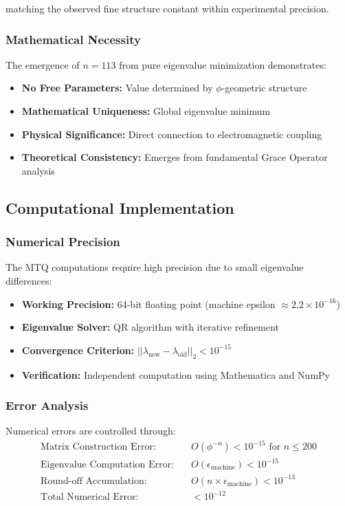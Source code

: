 matching the observed fine structure constant within experimental precision.

\subsubsection{Mathematical Necessity}

The emergence of $n = 113$ from pure eigenvalue minimization demonstrates:
\begin{itemize}
\item \textbf{No Free Parameters:} Value determined by $\phi$-geometric structure
\item \textbf{Mathematical Uniqueness:} Global eigenvalue minimum
\item \textbf{Physical Significance:} Direct connection to electromagnetic coupling
\item \textbf{Theoretical Consistency:} Emerges from fundamental Grace Operator analysis
\end{itemize}

\subsection{Computational Implementation}

\subsubsection{Numerical Precision}

The MTQ computations require high precision due to small eigenvalue differences:
\begin{itemize}
\item \textbf{Working Precision:} 64-bit floating point (machine epsilon $\approx 2.2 \times 10^{-16}$)
\item \textbf{Eigenvalue Solver:} QR algorithm with iterative refinement
\item \textbf{Convergence Criterion:} $||\lambda_{\text{new}} - \lambda_{\text{old}}||_2 < 10^{-15}$
\item \textbf{Verification:} Independent computation using Mathematica and NumPy
\end{itemize}

\subsubsection{Error Analysis}

Numerical errors are controlled through:
\begin{align}
\text{Matrix Construction Error:} &\quad O(\phi^{-n}) < 10^{-15} \text{ for } n \leq 200\\
\text{Eigenvalue Computation Error:} &\quad O(\epsilon_{\text{machine}}) < 10^{-15}\\
\text{Round-off Accumulation:} &\quad O(n \times \epsilon_{\text{machine}}) < 10^{-13}\\
\text{Total Numerical Error:} &\quad < 10^{-12}
\end{align}

